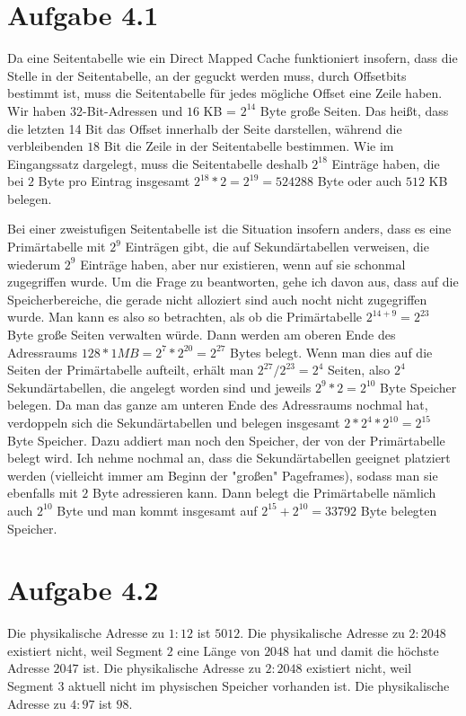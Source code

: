 \documentclass[10pt,a4paper]{article}
\begin{document}
\section*{Aufgabe 4.1}

Da eine Seitentabelle wie ein Direct Mapped Cache funktioniert insofern, dass die Stelle in der Seitentabelle, an der geguckt werden muss, durch Offsetbits bestimmt ist, muss die Seitentabelle für jedes mögliche Offset eine Zeile haben.
Wir haben 32-Bit-Adressen und $16$ KB = $2^14$ Byte große Seiten.
Das heißt, dass die letzten 14 Bit das Offset innerhalb der Seite darstellen, während die verbleibenden $18$ Bit die Zeile in der Seitentabelle bestimmen.
Wie im Eingangssatz dargelegt, muss die Seitentabelle deshalb $2^{18}$ Einträge haben, die bei $2$ Byte pro Eintrag insgesamt $2^{18} * 2 = 2^19 = 524288$ Byte oder auch $512$ KB belegen.

Bei einer zweistufigen Seitentabelle ist die Situation insofern anders, dass es eine Primärtabelle mit $2^{9}$ Einträgen gibt, die auf Sekundärtabellen verweisen, die wiederum $2^{9}$ Einträge haben, aber nur existieren, wenn auf sie schonmal zugegriffen wurde.
Um die Frage zu beantworten, gehe ich davon aus, dass auf die Speicherbereiche, die gerade nicht alloziert sind auch nocht nicht zugegriffen wurde.
Man kann es also so betrachten, als ob die Primärtabelle $2^{14 + 9} = 2^{23}$ Byte große Seiten verwalten würde.
Dann werden am oberen Ende des Adressraums $128 * 1MB = 2^{7} * 2^{20} = 2^{27}$ Bytes belegt.
Wenn man dies auf die Seiten der Primärtabelle aufteilt, erhält man $2^{27} / 2^{23} = 2^{4}$ Seiten, also $2^{4}$ Sekundärtabellen, die angelegt worden sind und jeweils $2^{9} * 2 = 2^{10}$ Byte Speicher belegen.
Da man das ganze am unteren Ende des Adressraums nochmal hat, verdoppeln sich die Sekundärtabellen und belegen insgesamt $2 * 2^{4} * 2^{10} = 2^{15}$ Byte Speicher.
Dazu addiert man noch den Speicher, der von der Primärtabelle belegt wird.
Ich nehme nochmal an, dass die Sekundärtabellen geeignet platziert werden (vielleicht immer am Beginn der "großen" Pageframes), sodass man sie ebenfalls mit $2$ Byte adressieren kann.
Dann belegt die Primärtabelle nämlich auch $2^{10}$ Byte und man kommt insgesamt auf $2^{15} + 2^{10} = 33792$ Byte belegten Speicher.

\section*{Aufgabe 4.2}

Die physikalische Adresse zu $1:12$ ist $5012$.
Die physikalische Adresse zu $2:2048$ existiert nicht, weil Segment $2$ eine Länge von $2048$ hat und damit die höchste Adresse $2047$ ist.
Die physikalische Adresse zu $2:2048$ existiert nicht, weil Segment $3$ aktuell nicht im physischen Speicher vorhanden ist.
Die physikalische Adresse zu $4:97$ ist $98$.
\end{document}
